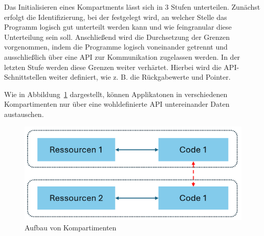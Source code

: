 Das Initialisieren eines Kompartments lässt sich in 3 Stufen unterteilen. Zunächst erfolgt die Identifizierung, bei der festgelegt wird, an welcher Stelle das Programm logisch gut unterteilt werden kann und wie feingranular diese Unterteilung sein soll.
Anschließend wird die Durchsetzung der Grenzen vorgenommen, indem die Programme logisch voneinander getrennt und ausschließlich über eine API zur Kommunikation zugelassen werden. 
In der letzten Stufe werden diese Grenzen weiter verhärtet. Hierbei wird die API-Schnittstellen weiter definiert, wie z. B. die Rückgabewerte und Pointer.

Wie in Abbildung~\ref{fig:Kompartment} dargestellt, können Applikatonen in verschiedenen Kompartimenten nur über eine wohldefinierte API untereinander Daten austauschen.

\begin{figure}[h]
    \centering
    \includegraphics[width=0.8\linewidth]{Grafiken/Kompartiment.png}
    \caption{Aufbau von Kompartimenten}
    \label{fig:Kompartment}
\end{figure}

